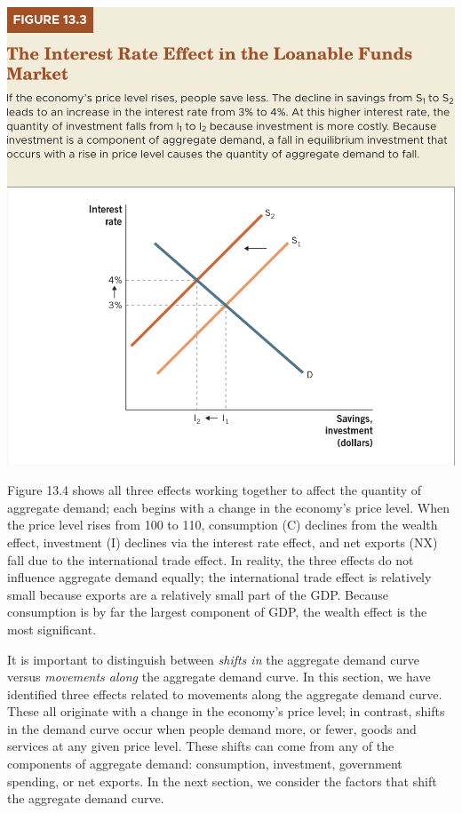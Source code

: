\documentclass[11pt]{article} %
\begin{document}
\begin{center}
\includegraphics[scale=0.5]{images/Figure 13.3.png} 
\end{center}

Figure 13.4 shows all three effects working together to affect the quantity of aggregate demand; each begins with a change in the economy's price level. When the price level rises from 100 to 110, consumption (C) declines from the wealth effect, investment (I) declines via the interest rate effect, and net exports (NX) fall due to the international trade effect. In reality, the three effects do not influence aggregate demand equally; the international trade effect is relatively small because exports are a relatively small part of the GDP. Because consumption is by far the largest component of GDP, the wealth effect is the most significant.

It is important to distinguish between \textit{shifts in} the aggregate demand curve versus \textit{movements along} the aggregate demand curve. In this section, we have identified three effects related to movements along the aggregate demand curve. These all originate with a change in the economy's price level; in contrast, shifts in the demand curve occur when people demand more, or fewer, goods and services at any given price level. These shifts can come from any of the components of aggregate demand: consumption, investment, government spending, or net exports. In the next section, we consider the factors that shift the aggregate demand curve.
\end{document}
